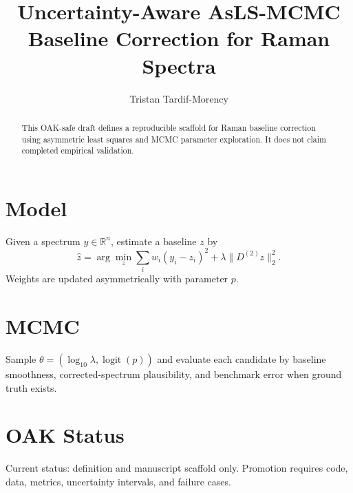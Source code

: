 \documentclass[conference]{IEEEtran}
\title{Uncertainty-Aware AsLS-MCMC Baseline Correction for Raman Spectra}
\author{Tristan Tardif-Morency}
\begin{document}
\maketitle
\begin{abstract}
This OAK-safe draft defines a reproducible scaffold for Raman baseline correction using asymmetric least squares and MCMC parameter exploration. It does not claim completed empirical validation.
\end{abstract}
\section{Model}
Given a spectrum $y \in \mathbb{R}^n$, estimate a baseline $z$ by
\begin{equation}
\hat z = \arg\min_z \sum_i w_i (y_i-z_i)^2 + \lambda \lVert D^{(2)}z \rVert_2^2.
\end{equation}
Weights are updated asymmetrically with parameter $p$.
\section{MCMC}
Sample $\theta=(\log_{10}\lambda,\operatorname{logit}(p))$ and evaluate each candidate by baseline smoothness, corrected-spectrum plausibility, and benchmark error when ground truth exists.
\section{OAK Status}
Current status: definition and manuscript scaffold only. Promotion requires code, data, metrics, uncertainty intervals, and failure cases.
\end{document}
